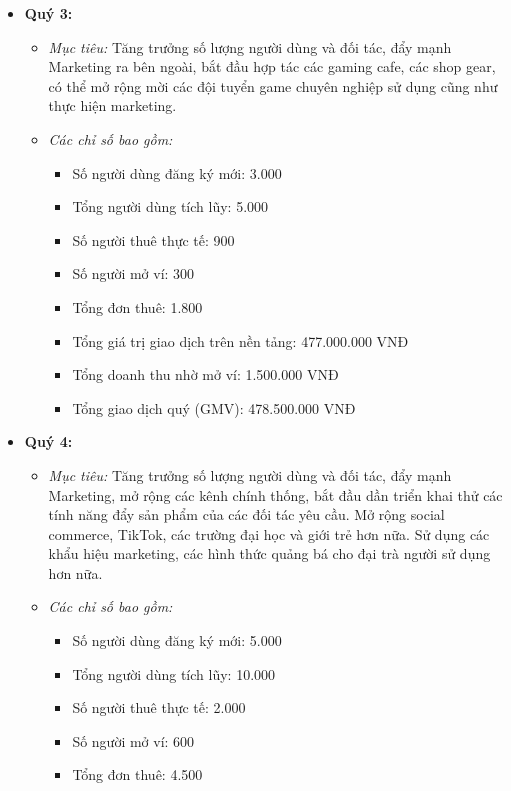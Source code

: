 \begin{itemize}
\begin{itemize}
\begin{itemize}
        \end{itemize}
    \end{itemize}
    \item \textbf{Quý 3:}
    \begin{itemize}
        \item \textit{Mục tiêu:} Tăng trưởng số lượng người dùng và đối tác, đẩy mạnh Marketing ra bên ngoài, bắt đầu hợp tác các gaming cafe, các shop gear, có thể mở rộng mời các đội tuyển game chuyên nghiệp sử dụng cũng như thực hiện marketing.
        \item \textit{Các chỉ số bao gồm:}
        \begin{itemize}
            \item Số người dùng đăng ký mới: 3.000
            \item Tổng người dùng tích lũy: 5.000
            \item Số người thuê thực tế: 900
            \item Số người mở ví: 300
            \item Tổng đơn thuê: 1.800
            \item Tổng giá trị giao dịch trên nền tảng: 477.000.000 VNĐ
            \item Tổng doanh thu nhờ mở ví: 1.500.000 VNĐ
            \item Tổng giao dịch quý (GMV): 478.500.000 VNĐ
        \end{itemize}
    \end{itemize}
    \item \textbf{Quý 4:}
    \begin{itemize}
        \item \textit{Mục tiêu:} Tăng trưởng số lượng người dùng và đối tác, đẩy mạnh Marketing, mở rộng các kênh chính thống, bắt đầu dần triển khai thử các tính năng đẩy sản phẩm của các đối tác yêu cầu. Mở rộng social commerce, TikTok, các trường đại học và giới trẻ hơn nữa. Sử dụng các khẩu hiệu marketing, các hình thức quảng bá cho đại trà người sử dụng hơn nữa.
        \item \textit{Các chỉ số bao gồm:}
        \begin{itemize}
            \item Số người dùng đăng ký mới: 5.000
            \item Tổng người dùng tích lũy: 10.000
            \item Số người thuê thực tế: 2.000
            \item Số người mở ví: 600
            \item Tổng đơn thuê: 4.500

\end{itemize}
\end{itemize}
\end{itemize}
